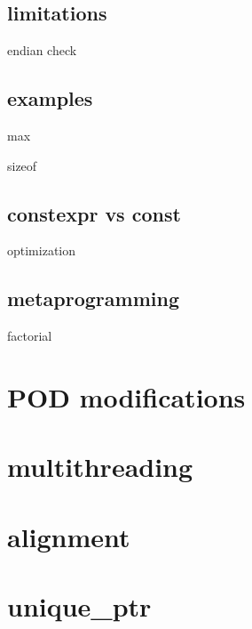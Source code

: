 \documentclass{beamer}
\begin{document}
\subsection{limitations}
\begin{frame}{endian check}
\end{frame}

\subsection{examples}
\begin{frame}{max}
\end{frame}

\begin{frame}{sizeof}
\end{frame}

\subsection{constexpr vs const}
\begin{frame}{optimization}
\end{frame}

\subsection{metaprogramming}
\begin{frame}{factorial}
\end{frame}

\section{POD modifications}
\section{multithreading}
\section{alignment}
\section{unique\_ptr}
\end{document}

